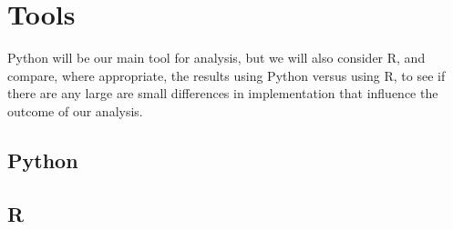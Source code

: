 \chapter{Tools}
Python will be our main tool for analysis, but we will also consider R, and compare, where appropriate, the results using Python versus using R, to see if there are any large are small differences in implementation that influence the outcome of our analysis.
\section{Python}
\section{R}
